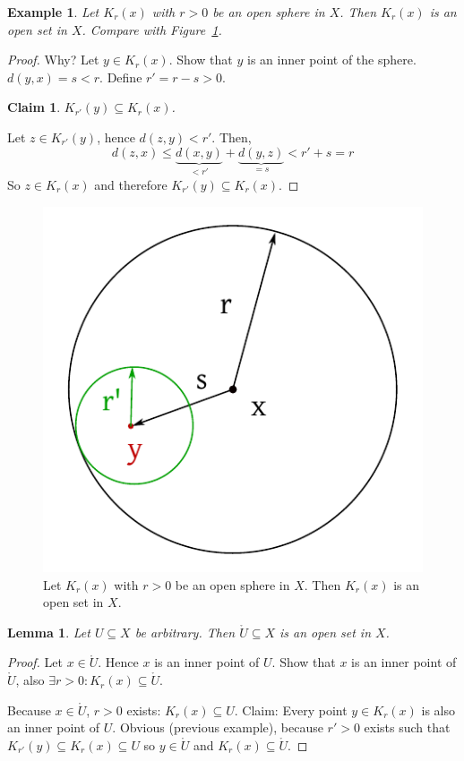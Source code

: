 \documentclass{article}
\newtheorem{example}{Example}  \numberwithin{example}{section}
\newtheorem{lemma}{Lemma}  \numberwithin{lemma}{section}
\newtheorem*{claim}{Claim}%
\begin{document}
\begin{example}
  Let $K_r(x)$ with $r > 0$ be an open sphere in $X$.
  Then $K_r(x)$ is an open set in $X$.
  Compare with Figure~\ref{img:opensp}.
\end{example}

\begin{proof}
  Why? Let $y \in K_r(x)$. Show that $y$ is an inner point of the sphere.
  $d(y,x) = s < r$. Define $r' = r - s > 0$.

  \begin{claim}
    $K_{r'}(y) \subseteq K_r(x)$.
  \end{claim}

  Let $z \in K_{r'}(y)$, hence $d(z, y) < r'$. Then,
  \[ d(z, x) \leq \underbrace{d(x, y)}_{< r'} + \underbrace{d(y, z)}_{= s} < r' + s = r \]
  So $z \in K_r(x)$ and therefore $K_{r'}(y) \subseteq K_r(x)$.
\end{proof}

\begin{figure}[t]
  \begin{center}
    \includegraphics{img/05_open_sphere.pdf}
    \caption{Let $K_r(x)$ with $r>0$ be an open sphere in $X$. Then $K_r(x)$ is an open set in $X$.}
    \label{img:opensp}
  \end{center}
\end{figure}


\begin{lemma}
  Let $U \subseteq X$ be arbitrary. Then $\mathring{U} \subseteq X$ is an open set in $X$.
\end{lemma}
\begin{proof}
  Let $x \in \mathring{U}$. Hence $x$ is an inner point of $U$.
  Show that $x$ is an inner point of $\mathring{U}$, also $\exists r > 0: K_r(x) \subseteq \mathring{U}$.

  Because $x \in \mathring U$, $r > 0$ exists: $K_r(x) \subseteq U$.
  Claim: Every point $y \in K_r(x)$ is also an inner point of $U$.
  Obvious (previous example), because $r' > 0$ exists such that
  $K_{r'}(y) \subseteq K_r(x) \subseteq U$ so $y \in \mathring U$ and $K_r(x) \subseteq \mathring U$.
\end{proof}
\end{document}

